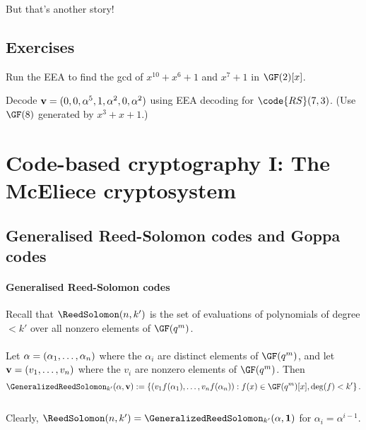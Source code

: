 \documentclass[a4paper, 11pt, openany]{book}
\begin{document}
But that's another story!




\subsection{Exercises}

\begin{exercise}
Run the EEA to find the gcd of $x^{10} + x^6 + 1$ and $x^7 + 1$ in $\GF(2)[x]$.
\end{exercise}


\begin{exercise}
Decode ${\bf v} = (0, 0, \alpha^5, 1, \alpha^2, 0, \alpha^2)$ using EEA decoding for $\code{RS}(7,3)$. (Use $\GF(8)$ generated by $x^3 + x + 1$.)
\end{exercise}





\section{Code-based cryptography I: The McEliece cryptosystem}
\label{sec:29}




\subsection{Generalised Reed-Solomon codes and Goppa codes}


\paragraph{Generalised Reed-Solomon codes}
Recall that $\ReedSolomon(n,k')$ is the set of evaluations of polynomials of degree $< k'$ over all nonzero elements of $\GF(q^m)$.\\
~\\
Let ${\bf \alpha} = (\alpha_1, \dots, \alpha_n)$ where the $\alpha_i$ are distinct elements of $\GF(q^m)$, and let ${\bf v} = (v_1, \dots, v_n)$ where the $v_i$ are nonzero elements of $\GF(q^m)$. Then
\[
	\GeneralizedReedSolomon_{k'} ({\bf \alpha}, {\bf v}) := \left\{ \left( v_1 f(\alpha_1), \dots, v_n f(\alpha_n) \right) : f(x) \in \GF(q^m)[x], \deg(f) < k' \right\}.
\]
~\\
Clearly, $\ReedSolomon(n,k') = \GeneralizedReedSolomon_{k'}({\bf \alpha}, {\bf 1})$ for $\alpha_i = \alpha^{i-1}$.
\end{document}
